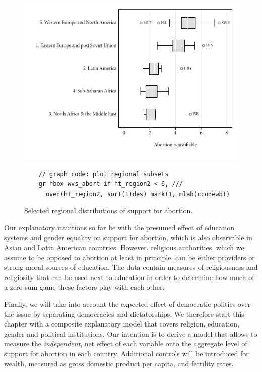 \begin{figure}[htp]
	\centering
	\includegraphics[width=.9\textwidth]{images/abortion_box.pdf}

	\caption[Regional distributions of support for abortion]{\label{fig:distr}
	Selected regional distributions of support for abortion. %
  \qog}

	\begin{verbatim}
	// graph code: plot regional subsets
	gr hbox wvs_abort if ht_region2 < 6, ///
	  over(ht_region2, sort(1)des) mark(1, mlab(ccodewb))
	\end{verbatim}
	
\end{figure}%

Our explanatory intuitions so far lie with the presumed effect of education systems and gender equality on support for abortion, which is also observable in Asian and Latin American countries. However, religious authorities, which we assume to be opposed to abortion at least in principle, can be either providers or strong moral sources of education. The data contain measures of religiousness and religiosity that can be used next to education in order to determine how much of a zero-sum game these factors play with each other.

Finally, we will take into account the expected effect of democratic politics over the issue by separating democracies and dictatorships. We therefore start this chapter with a composite explanatory model that covers religion, education, gender and political institutions. Our intention is to derive a model that allows to measure the \emph{independent}, net effect of each variable onto the aggregate level of support for abortion in each country. Additional controls will be introduced for wealth, measured as gross domestic product per capita, and fertility rates.

